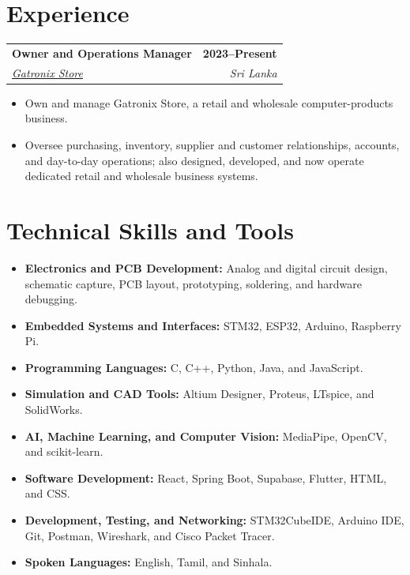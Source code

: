 \documentclass[a4paper,10pt]{article}
\makeatletter
\newcommand{\educationEntry}[4]{%
  \begin{tabularx}{\textwidth}{@{}Xr@{}}
    \textbf{#1} & \textbf{\small #2} \\
    \textit{#3} & \textit{\small #4}
  \end{tabularx}
}
\makeatother
\begin{document}
\vspace{1.1mm}

\section{Experience}

\educationEntry
  {Owner and Operations Manager}
  {2023--Present}
  {\href{https://maps.app.goo.gl/z9wBnqUMZs5da7UM9}{Gatronix Store \faMapMarker}}
  {Sri Lanka}

\begin{itemize}
  \item Own and manage Gatronix Store, a retail and wholesale computer-products business.
  \item Oversee purchasing, inventory, supplier and customer relationships, accounts, and day-to-day operations; also designed, developed, and now operate dedicated retail and wholesale business systems.
\end{itemize}

\section{Technical Skills and Tools}
\begin{itemize}[itemsep=0.8mm,topsep=0.45mm]
  \item \textbf{Electronics and PCB Development:} Analog and digital circuit design, schematic capture, PCB layout, prototyping, soldering, and hardware debugging.
  \item \textbf{Embedded Systems and Interfaces:} STM32, ESP32, Arduino, Raspberry Pi.
  \item \textbf{Programming Languages:} C, C++, Python, Java, and JavaScript.
  \item \textbf{Simulation and CAD Tools:} Altium Designer,  Proteus, LTspice, and SolidWorks.
  \item \textbf{AI, Machine Learning, and Computer Vision:} MediaPipe, OpenCV, and scikit-learn.
  \item \textbf{Software Development:} React, Spring Boot, Supabase, Flutter, HTML, and CSS.
  \item \textbf{Development, Testing, and Networking:} STM32CubeIDE, Arduino IDE, Git, Postman, Wireshark, and Cisco Packet Tracer.
  \item \textbf{Spoken Languages:} English, Tamil, and Sinhala.
\end{itemize}
\end{document}
